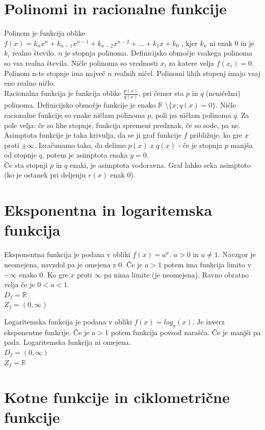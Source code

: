 \documentclass[12pt]{report}
\newcommand{\R}{\mathbb{R}}
\begin{document}
\section*{Polinomi in racionalne funkcije}
Polinom je funkcija oblike $f(x)= k_nx^n+k_{n-1}x^{n-1}+k_{n-2}x^{n-2}+ ... +k_1x+k_0$ , kjer $k_n$ ni enak 0 in je $k_i$ realno število. $n$ je stopnja polinoma. Definicijsko območje vsakega polinoma so vsa realna števila. Ničle polinoma so vrednosti $x_i$ za katere velja $f(x_i)=0$. Polinom n-te stopnje ima največ $n$ realnih ničel. Polinomi lihih stopenj imajo vsaj eno realno ničlo.\\
\bigbreak
Racionalna funkcija je funkcija oblike $\frac{p(x)}{q(x)}$, pri čemer sta $p$ in $q$ (neničelna) polinoma. Definicijsko območje funkcije je enako $\R$ \textbackslash $\{x; q(x) = 0\}$.
\bigbreak
Ničle racionalne funkcije so enake ničlam polinoma $p$, poli pa ničlam polinoma $q$.  Za pole velja: če so lihe stopnje, funkcija spremeni predznak, če so sode, pa ne.\\ Asimptota funkcije je taka krivulja, da se ji graf funkcije $f$ približuje, ko gre $x$ proti $\pm \infty$. Izračunamo tako, da delimo $p(x)$ z $q(x)$ - če je stopnja $p$ manjša od stopnje $q$, potem je asimptota enaka $y = 0$.\\
Če sta stopnji $p$ in $q$ enaki, je asimptota vodoravna. Graf lahko seka asimptoto (ko je ostanek pri deljenju $r(x)$ enak 0).

\section*{Eksponentna in logaritemska funkcija}
Eksponentna funkcija je podana v obliki $f(x) = a^x$. $a>0$ in $a\neq 1$. Navzgor je neomejena, navzdol pa je omejena z 0. Če je $a > 1$ potem ima funkcija limito v $-\infty$ enako 0. Ko gre $x$ proti $\infty$ pa nima limite (je neomejena). Ravno obratno velja če je $0 < a <1$.\\
$D_f = \R$ \\
$Z_f =(0,\infty)$
\bigbreak

Logaritemska funkcija je podana v obliki $f(x)=log_a(x)$. Je inverz eksponentne funkcije. Če je $a > 1$ potem funkcija povsod narašča. Če je manjši pa pada.  Logaritemska funkcija ni omejena.\\
$D_f = (0,\infty)$	\\
$Z_f = \R$

\section*{Kotne funkcije in ciklometrične funkcije}
 
\end{document}
